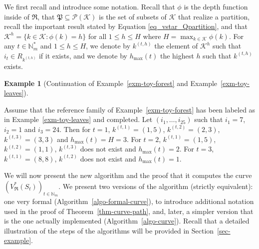 \documentclass[
  11pt,
  a4paper,
]{article}
\theoremstyle{plain}
\theoremstyle{definition}
\theoremstyle{plain}
\theoremstyle{definition}
\newtheorem{example}{Example}[section]
\theoremstyle{plain}
\theoremstyle{remark}
\begin{document}
We first recall and introduce some notation. Recall that \(\phi\) is the
depth function inside of \(\mathfrak{R}\), that
\(\mathfrak P \subseteq \mathcal P(\mathcal{K})\) is the set of subsets
of \(\mathcal{K}\) that realize a partition, recall the important result
stated by Equation \eqref{eq_vstar_Qpartition}, and that
\(\mathcal{K}^h=\{ k\in\mathcal{K}: \phi(k)=h  \}\) for all
\(1\leq h\leq H\) where \(H=\max_{k\in\mathcal{K}}\phi(k)\). For any
\(t\in\mathbb{N}_m^*\) and \(1\leq h\leq H\), we denote by \(k^{(t,h)}\)
the element of \(\mathcal{K}^h\) such that \(i_t\in R_{k^{(t,h)}}\) if
it exists, and we denote by \(h_{\max}(t)\) the highest \(h\) such that
\(k^{(t,h)}\) exists.

\begin{example}[Continuation of Example~\ref{exm-toy-forest} and
Example~\ref{exm-toy-leaves}]\protect\hypertarget{exm-kth}{}\label{exm-kth}

Assume that the reference family of Example~\ref{exm-toy-forest} has
been labeled as in Example~\ref{exm-toy-leaves} and completed. Let
\((i_1,\dotsc, i_{25})\) such that \(i_1=7\), \(i_2=1\) and \(i_3=24\).
Then for \(t=1\), \(k^{(t,1)}=(1,5)\), \(k^{(t,2)}=(2,3)\),
\(k^{(t,3)}=(3,3)\) and \(h_{\max}(t)=H=3\). For \(t=2\),
\(k^{(t,1)}=(1,5)\), \(k^{(t,2)}=(1,1)\), \(k^{(t,3)}\) does not exist
and \(h_{\max}(t)=2\). For \(t=3\), \(k^{(t,1)}=(8,8)\), \(k^{(t,2)}\)
does not exist and \(h_{\max}(t)=1\).

\end{example}

We will now present the new algorithm and the proof that it computes the
curve \((V^*_{\mathfrak{R}}(S_t))_{t\in\mathbb{N}_m}\). We present two
versions of the algorithm (strictly equivalent): one very formal
(Algorithm~\ref{algo-formal-curve}), to introduce additional notation
used in the proof of Theorem~\ref{thm-curve-path}, and, later, a simpler
version that is the one actually implemented
(Algorithm~\ref{algo-curve}). Recall that a detailed illustration of the
steps of the algorithms will be provided in Section~\ref{sec-example}.
\end{document}
